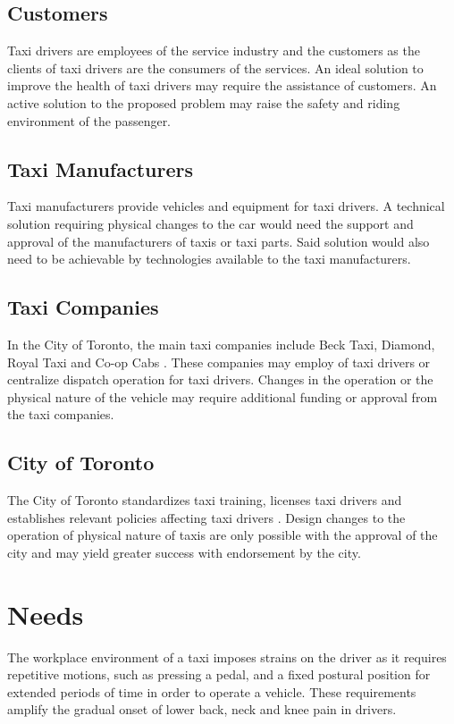 \documentclass[11pt]{article}
\begin{document}
\subsection{Customers}
Taxi drivers are employees of the service industry and the customers
as the clients of taxi drivers are the consumers of the services. An
ideal solution to improve the health of taxi drivers may require the
assistance of customers. An active solution to the proposed problem
may raise the safety and riding environment of the passenger.
 
\subsection{Taxi Manufacturers}
Taxi manufacturers provide vehicles and equipment for taxi drivers. A
technical solution requiring physical changes to the car would need
the support and approval of the manufacturers of taxis or taxi
parts. Said solution would also need to be achievable by technologies
available to the taxi manufacturers.
 
\subsection{Taxi Companies}
In the City of Toronto, the main taxi companies include Beck Taxi,
Diamond, Royal Taxi and Co-op Cabs \cite{abouttaxis}. These companies
may employ of taxi drivers or centralize dispatch operation for taxi
drivers. Changes in the operation or the physical nature of the
vehicle may require additional funding or approval from the taxi
companies.
 
\subsection{City of Toronto}
The City of Toronto standardizes taxi training, licenses taxi drivers
and establishes relevant policies affecting taxi drivers
\cite{CityofToronto}. Design changes to the operation of physical
nature of taxis are only possible with the approval of the city and
may yield greater success with endorsement by the city.

\section{Needs}
\label{sec:needs}
The workplace environment of a taxi imposes strains on the driver as it
requires repetitive motions, such as pressing a pedal, and a fixed postural
position for extended periods of time in order to operate a
vehicle. These requirements amplify the gradual onset of lower
back, neck and knee pain in drivers\cite{POSTULATED}. 
\end{document}

